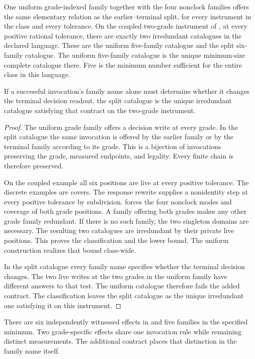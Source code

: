 \begin{theorem}\label{thm:basis}
One uniform grade-indexed family together with the four nonclock
families offers the same elementary relation as the earlier--terminal
split, for every instrument in the class and every tolerance.
On the coupled two-grade instrument of , at
every positive rational tolerance, there are exactly two irredundant
catalogues in the declared language. These are the uniform
five-family catalogue and the split six-family catalogue.
The uniform five-family catalogue is the unique minimum-size
complete catalogue there. Five is the minimum number sufficient
for the entire class in this language.

If a successful invocation's family name alone must determine
whether it changes the terminal decision readout, the split
catalogue is the unique irredundant catalogue satisfying that
contract on the two-grade instrument.
\end{theorem}
\begin{proof}
The uniform grade family offers a decision write at every grade.
In the split catalogue the same invocation is offered by the
earlier family or by the terminal family according to its grade.
This is a bijection of invocations preserving the grade,
measured endpoints, and legality. Every finite chain is
therefore preserved.

On the coupled example all six positions are live at every
positive tolerance. The discrete examples are covers.
The response rewrite supplies a nonidentity step at every
positive tolerance by subdivision.
 forces the four nonclock modes and coverage
of both grade positions. A family offering both grades makes
any other grade family redundant. If there is no such family,
the two singleton domains are necessary. The resulting two
catalogues are irredundant by their private live positions.
This proves the classification and the lower bound. The uniform
construction realizes that bound class-wide.

In the split catalogue every family name specifies whether the
terminal decision changes. The two live writes at the two
grades in the uniform family have different answers to that test.
The uniform catalogue therefore fails the added contract.
The classification leaves the split catalogue as the unique
irredundant one satisfying it on this instrument.
\end{proof}

There are six independently witnessed effects in
 and five families in the specified minimum.
Two grade-specific effects share one invocation rule while remaining
distinct measurements. The additional contract places that
distinction in the family name itself.
